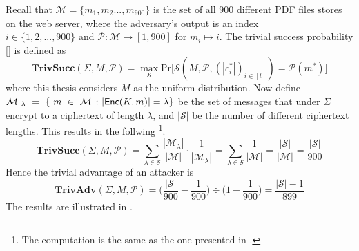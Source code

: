 Recall that $\mathcal{M} = \{m_{1}, m_{2} ... , m_{900}\}$ is the set of all $900$ different PDF files stores on the web server, where the adversary's output is an index \\
$i \in \{ 1, 2, ... , 900\}$ and $\mathcal{P}: \mathcal{M} \rightarrow [1,900]$ for $m_{i} \mapsto i$. The trivial success probability [] is defined as
\begin{equation*}
\mathbf{TrivSucc}(\Sigma,M,\mathcal{P}) = \mathop{max}_{\mathcal{S}} \text{Pr}\big[ \mathcal{S}(M, \mathcal{P},(|c_{i}^{*}|)_{i \in [t]}) = \mathcal{P}(m^{*})\big]
\end{equation*}
where this thesis considers $M$ as the uniform distribution. Now define
$\mathcal{M}~_{\lambda}~=~\{~m~\in~\mathcal{M}~ \colon |\mathsf{Enc}(K, m)| = \lambda \}$ be the set of messages that under $\Sigma$ encrypt to a ciphertext of length $\lambda$, and $|\mathcal{S}|$ be the number of different ciphertext lengths. This results in the follwing \footnote{The computation is the same as the one presented in \cite{DBLP:conf/ctrsa/GellertJLN22}.}.
$$
\mathbf{TrivSucc}(\Sigma,M,\mathcal{P}) = \sum_{\lambda \in \mathcal{S}} \frac{|\mathcal{M}_{\lambda}|}{|\mathcal{M}|} \cdot \frac{1}{|\mathcal{M}_{\lambda}|} = \sum_{\lambda \in \mathcal{S}} \frac{1}{|\mathcal{M}|} = \frac{|\mathcal{S}|}{|\mathcal{M}|} = \frac{|\mathcal{S}|}{900}
$$
Hence the trivial advantage of an attacker is
$$
\mathbf{TrivAdv}(\Sigma,M,\mathcal{P}) = \big( \frac{|\mathcal{S}|}{900} - \frac{1}{900} \big) \div \big( 1 - \frac{1}{900} \big)  = \frac{|\mathcal{S}|-1}{899}
$$
The results are illustrated in .


